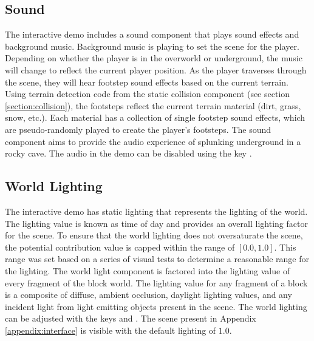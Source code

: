 \documentclass[a4paper,11pt,titlepage]{scrartcl}
\begin{document}
\subsection{Sound}
\label{section:sound}
The interactive demo includes a sound component that plays sound effects and background music.  Background music is playing to set the scene for the player.  Depending on whether the player is in the overworld or underground, the music will change to reflect the current player position.  As the player traverses through the scene, they will hear footstep sound effects based on the current terrain.  Using terrain detection code from the static collision component (see section \ref{section:collision}), the footsteps reflect the current terrain material (dirt, grass, snow, etc.).  Each material has a collection of single footstep sound effects, which are pseudo-randomly played to create the player's footsteps.  The sound component aims to provide the audio experience of splunking underground in a rocky cave.
\vskip 2.5mm\noindent
The audio in the demo can be disabled using the key .
    
\subsection{World Lighting}
\label{section:lighting}
The interactive demo has static lighting that represents the lighting of the world.  The lighting value is known as time of day and provides an overall lighting factor for the scene.  To ensure that the world lighting does not oversaturate the scene, the potential contribution value is capped within the range of $[0.0, 1.0]$.  This range was set based on a series of visual tests to determine a reasonable range for the lighting.  The world light component is factored into the lighting value of every fragment of the block world.  The lighting value for any fragment of a block is a composite of diffuse, ambient occlusion, daylight lighting values, and any incident light from light emitting objects present in the scene. 
\vskip 2.5mm\noindent
The world lighting can be adjusted with the keys  and .  The scene present in Appendix \ref{appendix:interface} is visible with the default lighting of $1.0$.
    
\end{document}
